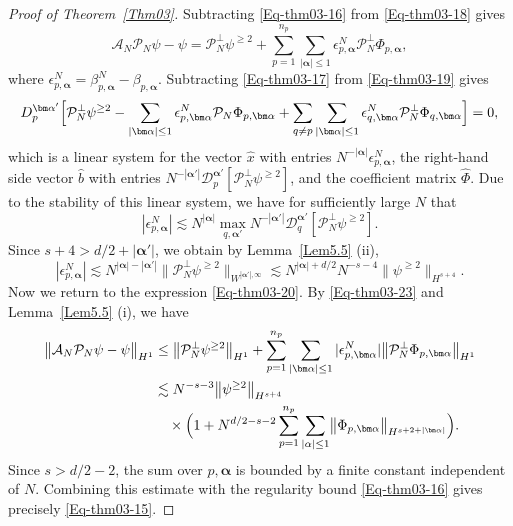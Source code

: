 \documentclass{sn-jnl}%
\numberwithin{equation}{section}
\theoremstyle{thmstyleone}%
\theoremstyle{thmstyletwo}%
\theoremstyle{thmstylethree}%
\begin{document}
\begin{proof}[Proof of Theorem~\ref{Thm03}]
    Subtracting \eqref{Eq-thm03-16} from \eqref{Eq-thm03-18} gives
    \begin{equation}\label{Eq-thm03-20}
        \mathcal{A}_N \mathcal{P}_N\psi-\psi = \mathcal{P}_N^\perp\psi^{\geq 2}+\sum_{p=1}^{n_p}\sum_{|\bm \alpha|\leq 1}\epsilon^N_{p,\bm \alpha}\mathcal{P}_N^\perp\Phi_{p,\bm \alpha},
    \end{equation}
    where $\epsilon_{p,\bm \alpha}^N = \beta_{p,\bm \alpha}^N -\beta_{p,\bm \alpha}$. 
    Subtracting \eqref{Eq-thm03-17} from \eqref{Eq-thm03-19} gives 
    \begin{equation}\label{Eq-thm03-21}
        {D}^{\bm \alpha'}_{p}\Bigl[\mathcal{P}_N^\perp\psi^{\geq 2}-\sum_{|\bm \alpha|\le 1} \epsilon^N_{p,\bm \alpha}\mathcal{P}_N\Phi_{p,\bm\alpha}+\sum_{q\neq p}\sum_{|\bm \alpha|\le 1}\epsilon^N_{q,\bm \alpha}\mathcal{P}_N^\perp\Phi_{q,\bm\alpha}\Bigr] = 0,
    \end{equation}
    which is a linear system for the vector $\hat{x}$ with entries $N^{-|\bm \alpha|}\epsilon^N_{p,\bm \alpha}$, the right-hand side vector $\hat{b}$ with entries $N^{-|\bm \alpha'|}\mathcal{D}^{\bm \alpha'}_p[\mathcal{P}_N^\perp \psi^{\geq 2}]$, and the coefficient matrix $\hat{\Phi}$. Due to the stability of this linear system, we have for sufficiently large $N$ that
    \begin{equation}
        |\epsilon_{p,\bm \alpha}^N|\lesssim N^{|\bm \alpha|}\max_{q,\bm \alpha'} N^{-|\bm \alpha'|}\mathcal{D}_q^{\bm \alpha'}[\mathcal{P}^\perp_N\psi^{\geq 2}].
    \end{equation}
    Since $s+4>d/2+|\bm \alpha'|$,  we obtain by  Lemma~\ref{Lem5.5} (ii),
    \begin{equation}\label{Eq-thm03-23}
        |\epsilon_{p,\bm \alpha}^N|
        \lesssim N^{|\bm \alpha|-|\bm \alpha'|}\bigl\|\mathcal{P}^\perp_N\psi^{\geq 2}\bigr\|_{W^{|\bm \alpha'|,\infty}}
        \lesssim N^{|\bm \alpha|+d/2}N^{-s-4}\bigl\|\psi^{\geq 2}\bigr\|_{H^{s+4}}.
    \end{equation}
    Now we return to the expression \eqref{Eq-thm03-20}. By \eqref{Eq-thm03-23} and Lemma~\ref{Lem5.5} (i), we have 
    \begin{equation}
    \begin{aligned}
        \bigl\|\mathcal{A}_N \mathcal{P}_N\psi-\psi\bigr\|_{H^1} 
        &\leq \bigl\|\mathcal{P}_N^\perp\psi^{\geq 2}\bigr\|_{H^1} + \sum_{p=1}^{n_p}\sum_{|\bm \alpha|\leq 1}|\epsilon^N_{p,\bm \alpha}| \bigl\|\mathcal{P}_N^\perp\Phi_{p,\bm \alpha}\bigr\|_{H^1}\\
        &\lesssim N^{-s-3}\bigl\|\psi^{\geq 2}\bigr\|_{H^{s+4}}\\
        &\quad \times\Bigl(1 + N^{d/2-s-2}\sum_{p=1}^{n_p}\sum_{|\alpha|\leq 1} \bigl\|\Phi_{p,\bm \alpha}\bigr\|_{H^{s+2+|\bm \alpha|}}\Bigr).
    \end{aligned}
    \end{equation}
    Since $s>d/2-2$, the sum over $p,\bm \alpha$ is bounded by a finite constant independent of $N$. Combining this estimate with the regularity bound \eqref{Eq-thm03-16} gives precisely \eqref{Eq-thm03-15}.


\end{proof}
\end{document}
